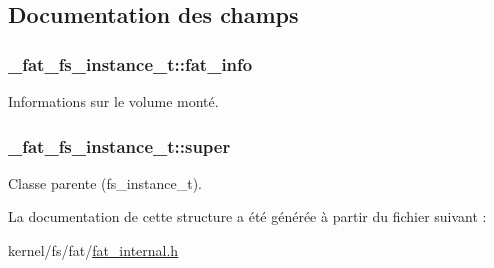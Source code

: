 \subsection{\-Documentation des champs}
\hypertarget{struct__fat__fs__instance__t_acebada58b620f950c9ef3c454db812fc}{
\subsubsection[{fat\-\_\-info}]{ {\bf \-\_\-fat\-\_\-fs\-\_\-instance\-\_\-t\-::fat\-\_\-info}}}\label{struct__fat__fs__instance__t_acebada58b620f950c9ef3c454db812fc}
\-Informations sur le volume monté. \hypertarget{struct__fat__fs__instance__t_ac50318180f107a1950961c404ec6fd6d}{
\subsubsection[{super}]{ {\bf \-\_\-fat\-\_\-fs\-\_\-instance\-\_\-t\-::super}}}\label{struct__fat__fs__instance__t_ac50318180f107a1950961c404ec6fd6d}
\-Classe parente (fs\-\_\-instance\-\_\-t). 

\-La documentation de cette structure a été générée à partir du fichier suivant \-:\begin{DoxyCompactItemize}
\item 
kernel/fs/fat/\hyperlink{fat__internal_8h}{fat\-\_\-internal.\-h}\end{DoxyCompactItemize}
